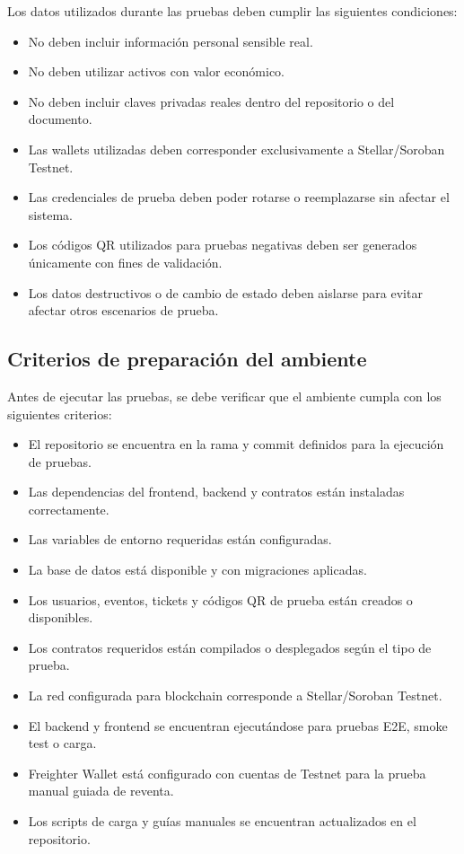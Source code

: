 \documentclass[12pt,letterpaper]{article}
\begin{document}
Los datos utilizados durante las pruebas deben cumplir las siguientes condiciones:

\begin{itemize}
    \item No deben incluir información personal sensible real.
    \item No deben utilizar activos con valor económico.
    \item No deben incluir claves privadas reales dentro del repositorio o del documento.
    \item Las wallets utilizadas deben corresponder exclusivamente a Stellar/Soroban Testnet.
    \item Las credenciales de prueba deben poder rotarse o reemplazarse sin afectar el sistema.
    \item Los códigos QR utilizados para pruebas negativas deben ser generados únicamente con fines de validación.
    \item Los datos destructivos o de cambio de estado deben aislarse para evitar afectar otros escenarios de prueba.
\end{itemize}

\subsection{Criterios de preparación del ambiente}

Antes de ejecutar las pruebas, se debe verificar que el ambiente cumpla con los siguientes criterios:

\begin{itemize}
    \item El repositorio se encuentra en la rama y commit definidos para la ejecución de pruebas.
    \item Las dependencias del frontend, backend y contratos están instaladas correctamente.
    \item Las variables de entorno requeridas están configuradas.
    \item La base de datos está disponible y con migraciones aplicadas.
    \item Los usuarios, eventos, tickets y códigos QR de prueba están creados o disponibles.
    \item Los contratos requeridos están compilados o desplegados según el tipo de prueba.
    \item La red configurada para blockchain corresponde a Stellar/Soroban Testnet.
    \item El backend y frontend se encuentran ejecutándose para pruebas E2E, smoke test o carga.
    \item Freighter Wallet está configurado con cuentas de Testnet para la prueba manual guiada de reventa.
    \item Los scripts de carga y guías manuales se encuentran actualizados en el repositorio.
\end{itemize}
\end{document}
